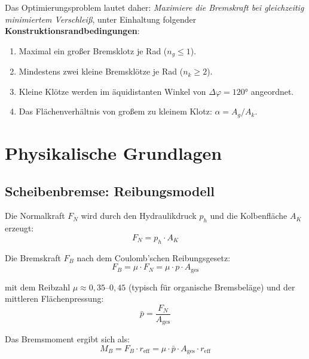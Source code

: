 ﻿\documentclass[12pt,a4paper]{article}
\theoremstyle{definition}
\begin{document}
Das Optimierungsproblem lautet daher: \emph{Maximiere die Bremskraft bei
gleichzeitig minimiertem Verschleiß}, unter Einhaltung folgender
\textbf{Konstruktionsrandbedingungen}:

\begin{enumerate}[leftmargin=2em]
  \item Maximal ein großer Bremsklotz je Rad ($n_g \leq 1$).
  \item Mindestens zwei kleine Bremsklötze je Rad ($n_k \geq 2$).
  \item Kleine Klötze werden im äquidistanten Winkel von $\Delta\varphi = 120 °$
        angeordnet.
  \item Das Flächenverhältnis von großem zu kleinem Klotz: $\alpha = A_g/A_k$.
\end{enumerate}

\section{Physikalische Grundlagen}

\subsection{Scheibenbremse: Reibungsmodell}

Die Normalkraft $F_N$ wird durch den Hydraulikdruck $p_h$ und die
Kolbenfläche $A_K$ erzeugt:
\begin{equation}
  F_N = p_h \cdot A_K
  \label{eq:normalkraft}
\end{equation}

Die Bremskraft $F_B$ nach dem Coulomb'schen Reibungsgesetz:
\begin{equation}
  F_B = \mu \cdot F_N = \mu \cdot p \cdot A_{\text{ges}}
  \label{eq:bremskraft}
\end{equation}

mit dem Reib\-zahl $\mu \approx 0{,}35$--$0{,}45$ (typisch für organische
Bremsbeläge) und der mittleren Flächenpressung:
\begin{equation}
  \bar{p} = \frac{F_N}{A_{\text{ges}}}
  \label{eq:pressung}
\end{equation}

Das Bremsmoment ergibt sich als:
\begin{equation}
  M_B = F_B \cdot r_{\text{eff}}
      = \mu \cdot \bar{p} \cdot A_{\text{ges}} \cdot r_{\text{eff}}
  \label{eq:bremsmoment}
\end{equation}
\end{document}
